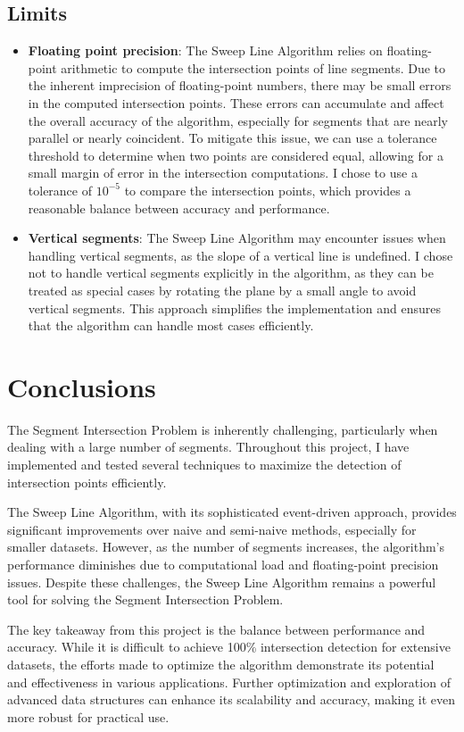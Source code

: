 \documentclass[10pt,a4paper,hidelinks]{article}
\begin{document}
\subsection{Limits}
\begin{itemize}
    \item \textbf{Floating point precision}: The Sweep Line Algorithm relies on floating-point arithmetic to compute the intersection points of line segments. Due to the inherent imprecision of floating-point numbers, there may be small errors in the computed intersection points. These errors can accumulate and affect the overall accuracy of the algorithm, especially for segments that are nearly parallel or nearly coincident. To mitigate this issue, we can use a tolerance threshold to determine when two points are considered equal, allowing for a small margin of error in the intersection computations. I chose to use a tolerance of $10^{-5}$ to compare the intersection points, which provides a reasonable balance between accuracy and performance.
    \item \textbf{Vertical segments}: The Sweep Line Algorithm may encounter issues when handling vertical segments, as the slope of a vertical line is undefined. I chose not to handle vertical segments explicitly in the algorithm, as they can be treated as special cases by rotating the plane by a small angle to avoid vertical segments. This approach simplifies the implementation and ensures that the algorithm can handle most cases efficiently.
\end{itemize}

\section{Conclusions}
The Segment Intersection Problem is inherently challenging, particularly when dealing with a large number of segments. Throughout this project, I have implemented and tested several techniques to maximize the detection of intersection points efficiently.

The Sweep Line Algorithm, with its sophisticated event-driven approach, provides significant improvements over naive and semi-naive methods, especially for smaller datasets. However, as the number of segments increases, the algorithm's performance diminishes due to computational load and floating-point precision issues. Despite these challenges, the Sweep Line Algorithm remains a powerful tool for solving the Segment Intersection Problem.

The key takeaway from this project is the balance between performance and accuracy. While it is difficult to achieve 100\% intersection detection for extensive datasets, the efforts made to optimize the algorithm demonstrate its potential and effectiveness in various applications. Further optimization and exploration of advanced data structures can enhance its scalability and accuracy, making it even more robust for practical use.
\end{document}
